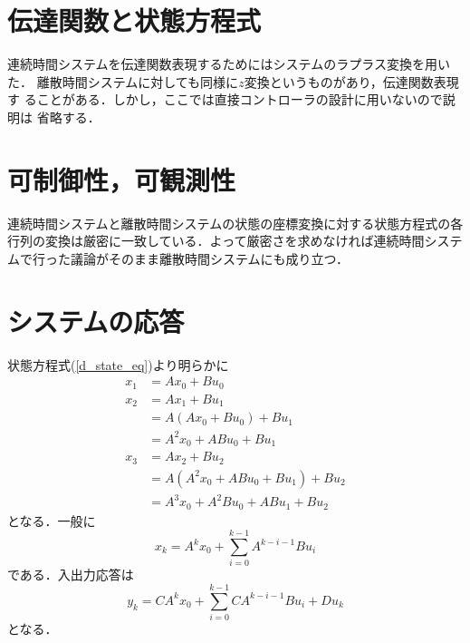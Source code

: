 \section{伝達関数と状態方程式}
連続時間システムを伝達関数表現するためにはシステムのラプラス変換を用いた．
離散時間システムに対しても同様に$z$変換というものがあり，伝達関数表現す
ることがある．しかし，ここでは直接コントローラの設計に用いないので説明は
省略する．
\section{可制御性，可観測性}
連続時間システムと離散時間システムの状態の座標変換に対する状態方程式の各
行列の変換は厳密に一致している．よって厳密さを求めなければ連続時間システ
ムで行った議論がそのまま離散時間システムにも成り立つ．
\section{システムの応答}
状態方程式(\ref{d_state_eq})より明らかに
\begin{align*}
 x_1 &= A x_0 + B u_0 \\
 x_2 &= A x_1 + B u_1 \\
     &= A (A x_0 + B u_0) + B u_1 \\
     &= A^2 x_0 + A B u_0 + B u_1 \\
 x_3 &= A x_2 + B u_2 \\
     &= A (A^2 x_0 + A B u_0 + B u_1) + B u_2 \\
     &= A^3 x_0 + A^2 B u_0 + A B u_1 + B u_2
\end{align*}
となる．一般に
\begin{equation}
 x_k = A^k x_0 + \sum_{i=0}^{k-1} A^{k-i-1} B u_i
\end{equation}
である．入出力応答は
\begin{equation}
 y_k = C A^k x_0 + \sum_{i=0}^{k-1} C A^{k-i-1} B  u_i + D u_k
\end{equation}
となる．
